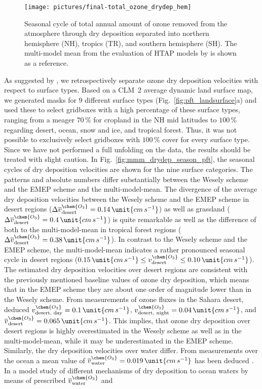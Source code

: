 \documentclass[gmd, manuscript]{copernicus}
\begin{document}
%
\begin{figure*}[t]
  \texttt{[image: pictures/final-total\_ozone\_drydep\_hem]}
  \caption{Seasonal cycle of total annual amount of ozone removed from the atmosphere through dry deposition separated into northern hemisphere (NH), tropics (TR), and southern hemisphere (SH). The multi-model mean from the evaluation of HTAP models by \citet{ACP:Hardacre2015} is shown as a reference.}
  \label{fig:mmm_drydep_hem}
\end{figure*}
%
As suggested by \citet{ACP:Hardacre2015}, we retrospectively separate ozone dry deposition velocities with respect to surface types. Based on a CLM~2 average dynamic land surface map, we generated masks for 9 different surface types (Fig.~\ref{fig:pft_landsurface}a) and used these to select gridboxes with a high percentage of these surface types, ranging from a meager $70\,\unit{\%}$ for cropland in the NH mid latitudes to $100\,\unit{\%}$ regarding desert, ocean, snow and ice, and tropical forest. Thus, it was not possible to exclusively select gridboxes with $100\,\unit{\%}$ cover for every surface type. Since we have not performed a full unfolding on the data, the results should be treated with slight caution. In Fig.~\ref{fig:mmm_drydep_season_pft}, the seasonal cycles of dry deposition velocities are shown for the nine surface categories. The patterns and absolute numbers differ substantially between the Wesely scheme and the EMEP scheme and the multi-model-mean. The divergence of the average dry deposition velocities between the Wesely scheme and the EMEP scheme in desert regions ($\Delta \overline{v}_\text{desert}^\chem{O_3} = 0.14\,\unit{cm\,s^{-1}}$) as well as grassland ($\Delta \overline{v}_\text{desert}^\chem{O_3} = 0.4\,\unit{cm\,s^{-1}}$) is quite remarkable as well as the difference of both to the multi-model-mean in tropical forest regions ($\Delta \overline{v}_\text{desert}^\chem{O_3} = 0.38\,\unit{cm\,s^{-1}}$). In contrast to the Wesely scheme and the EMEP scheme, the multi-model-mean indicates a rather pronounced seasonal cycle in desert regions ($0.15\,\unit{cm\,s^{-1}} \leq v^\chem{O_3}_\text{desert}\leq 0.10\,\unit{cm\,s^{-1}}$). The estimated dry deposition velocities over desert regions are consistent with the previously mentioned baseline values of ozone dry deposition, which means that in the EMEP scheme they are about one order of magnitude lower than in the Wesely scheme. From measurements of ozone fluxes in the Sahara desert, \citet{AE:Gusten1995} deduced $v^\chem{O_3}_\text{desert, day} = 0.1\,\unit{cm\,s^{-1}}$, $v^\chem{O_3}_\text{desert, night} = 0.04\,\unit{cm\,s^{-1}}$, and $\overline{v}^\chem{O_3}_\text{desert} = 0.065\,\unit{cm\,s^{-1}}$. This implies, that ozone dry deposition over desert regions is highly overestimated in the Wesely scheme as well as in the multi-model-mean, while it may be underestimated in the EMEP scheme. Similarly, the dry deposition velocities over water differ. From measurements over the ocean a mean value of $\overline{v}^\chem{O_3}_\text{water} = 0.019\,\unit{cm\,s^{-1}}$ has been deduced \citep{JGR:Helmig2012}. In a model study of different mechanisms of dry deposition to ocean waters by means of prescribed $\overline{v}_\text{water}^\chem{O_3}$ and 
\end{document}

